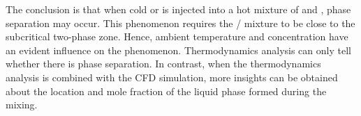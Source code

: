 The conclusion is that when cold  or  is injected into a hot mixture of  and , phase separation may occur. This phenomenon requires the / mixture to be close to the subcritical two-phase zone. %
Hence, ambient temperature and  concentration have an evident influence on the phenomenon. Thermodynamics analysis can only tell whether there is phase separation. In contrast, when the thermodynamics analysis is combined with the CFD simulation, more insights can be obtained about the location and mole fraction of the liquid phase formed during the mixing. %



